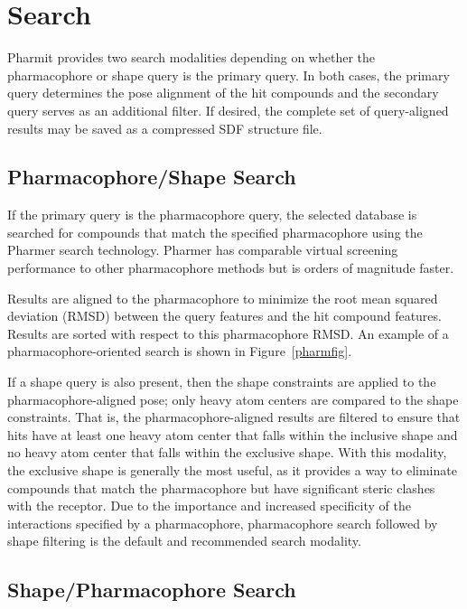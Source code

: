 \section{Search}

Pharmit provides two search modalities depending on whether the pharmacophore or shape query is the primary query.  In both cases, the primary query determines the pose alignment of the hit compounds and the secondary query serves as an additional filter.
If desired, the complete set of query-aligned results may be saved as a compressed SDF structure file.

\subsection{Pharmacophore/Shape Search}

If the primary query is the pharmacophore query, the selected database is searched for compounds that match the specified pharmacophore using the Pharmer \cite{Koes_2011} search technology.  Pharmer has comparable virtual screening performance to other pharmacophore methods \cite{Sanders_2012} but is orders of magnitude faster.

Results are aligned to the pharmacophore to minimize the root mean squared deviation (RMSD) between the query features and the hit compound features. Results are sorted with respect to this pharmacophore RMSD. An example of a pharmacophore-oriented search is shown in Figure~\ref{pharmfig}.

If a shape query is also present, then the shape constraints are applied to the pharmacophore-aligned pose; only heavy atom centers are compared to the shape constraints.  That is, the pharmacophore-aligned results are filtered to ensure that hits have at least one heavy atom center that falls within the inclusive shape and no heavy atom center that falls within the exclusive shape.  With this modality, the exclusive shape is generally the most useful, as it provides a way to eliminate compounds that match the pharmacophore but have significant steric clashes with the receptor.
Due to the importance and increased specificity of the interactions specified by a pharmacophore, pharmacophore search followed by shape filtering is the default and recommended search modality.  

\subsection{Shape/Pharmacophore Search}

